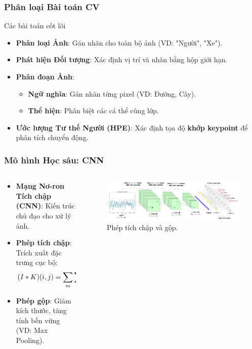 \begin{frame}
\frametitle{Phân loại Bài toán CV}
\begin{block}{Các bài toán cốt lõi}
\begin{itemize}
\item \textbf{Phân loại Ảnh}: Gán nhãn cho toàn bộ ảnh (VD: "Người", "Xe").
\item \textbf{Phát hiện Đối tượng}: Xác định vị trí và nhãn bằng hộp giới hạn.
\item \textbf{Phân đoạn Ảnh}:
\begin{itemize}
\item \textbf{Ngữ nghĩa}: Gán nhãn từng pixel (VD: Đường, Cây).
\item \textbf{Thể hiện}: Phân biệt các cá thể cùng lớp.
\end{itemize}
\item \textbf{Ước lượng Tư thế Người (HPE)}: Xác định tọa độ \textbf{khớp keypoint} để phân tích chuyển động.
\end{itemize}
\end{block}
\end{frame}


\begin{frame}
\frametitle{Mô hình Học sâu: CNN}
\begin{columns}
\begin{column}{0.5\textwidth}
\begin{itemize}
\item \textbf{Mạng Nơ-ron Tích chập (CNN)}: Kiến trúc chủ đạo cho xử lý ảnh.
\item \textbf{Phép tích chập}: Trích xuất đặc trưng cục bộ:
\begin{equation}
\footnotesize
(I * K)(i, j) = \sum_{m} \sum_{n} I(i-m, j-n) K(m, n)
\end{equation}
\item \textbf{Phép gộp}: Giảm kích thước, tăng tính bền vững (VD: Max Pooling).
\end{itemize}
\end{column}

\begin{column}{0.45\textwidth}
\begin{figure}
\centering
\includegraphics[width=\textwidth]{images/2_2_convolution.jpeg}
\caption{Phép tích chập và gộp.}
\label{fig:cnn_ops}
\end{figure}
\end{column}
\end{columns}
\end{frame}

